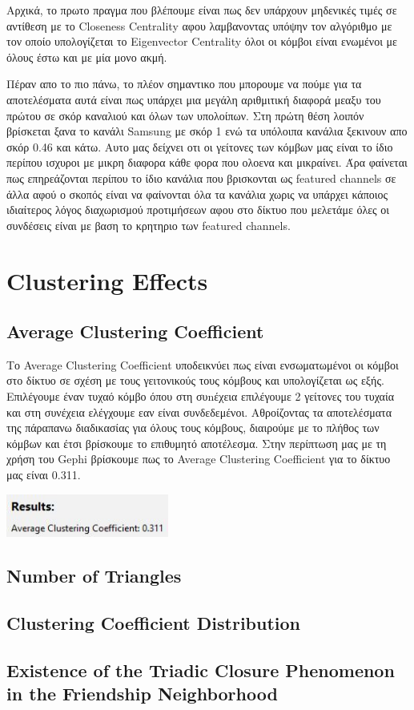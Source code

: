 \documentclass[12pt]{article}
\begin{document}
	\newpage
	Αρχικά, το πρωτο πραγμα που βλέπουμε είναι πως δεν υπάρχουν μηδενικές τιμές σε αντίθεση με το Closeness Centrality αφου λαμβανοντας υπόψην τον αλγόριθμο με τον οποίο υπολογίζεται το Eigenvector Centrality όλοι οι κόμβοι είναι ενωμένοι με όλους έστω και με μία μονο ακμή.
	\par
	Πέραν απο το πιο πάνω, το πλέον σημαντικο που μπορουμε να πούμε για τα αποτελέσματα αυτά είναι πως υπάρχει μια μεγάλη αριθμιτική διαφορά μεαξυ του πρώτου σε σκόρ καναλιού και όλων των υπολοίπων. Στη πρώτη θέση λοιπόν βρίσκεται ξανα το κανάλι Samsung με σκόρ 1 ενώ τα υπόλοιπα κανάλια ξεκινουν απο σκόρ 0.46 και κάτω. Αυτο μας δείχνει οτι οι γείτονες των κόμβων μας είναι το ίδιο περίπου ισχυροι με μικρη διαφορα κάθε φορα που ολοενα και μικραίνει. Άρα φαίνεται πως επηρεάζονται περίπου το ίδιο κανάλια που βρισκονται ως featured channels σε άλλα αφού ο σκοπός είναι να φαίνονται όλα τα κανάλια χωρις να υπάρχει κάποιος ιδιαίτερος λόγος διαχωρισμού προτιμήσεων αφου στο δίκτυο που μελετάμε όλες οι συνδέσεις είναι με βαση το κρητηριο των featured channels.
	\label{chap:centrality_measures_7}
	
	
	\newpage
	\section{Clustering Effects}
	\subsection{Average Clustering Coefficient}
	Το Average Clustering Coefficient υποδεικνύει πως είναι ενσωματωμένοι οι κόμβοι στο δίκτυο σε σχέση με τους γειτονικούς τους κόμβους και υπολογίζεται ως εξής. Επιλέγουμε έναν τυχαό κόμβο όπου στη συnέχεια επιλέγουμε 2 γείτονες του τυχαία και στη συνέχεια ελέγχουμε εαν είναι συνδεδεμένοι. Αθροίζοντας τα αποτελέσματα της πάραπανω διαδικασίας για όλους τους κόμβους, διαιρούμε με το πλήθος των κόμβων και έτσι βρίσκουμε το επιθυμητό αποτέλεσμα. Στην περίπτωση μας με τη χρήση του Gephi βρίσκουμε πως το Average Clustering Coefficient για το δίκτυο μας είναι 0.311.
	\begin{center}
		\includegraphics[width=0.4\textwidth]{photos-files/section8/average_clustering_coefficient.JPG}
	\end{center}	
	
	\newpage
	\subsection{Number of Triangles}
	
	
	
	\subsection{Clustering Coefficient Distribution}
	
	
	\subsection{Existence of the Triadic Closure Phenomenon in the Friendship Neighborhood}
	\label{chap:clustering_effects_8}
	
	
\end{document}
